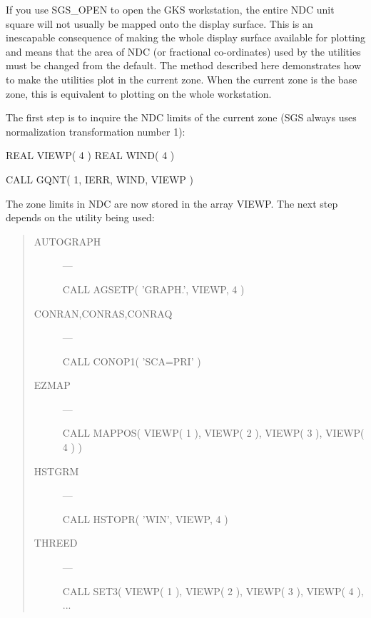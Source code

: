 \documentclass[twoside,11pt,nolof,noabs]{starlink}
\begin{document}
If you use SGS\_OPEN to open the GKS workstation, the entire NDC unit square
will not usually be mapped onto the display surface. 
This is an inescapable consequence of making the whole display surface
available for plotting and means that the area of NDC (or fractional
co-ordinates) used by the utilities must be changed from the default.
The method described here demonstrates how to make the utilities plot in the
current zone. 
When the current zone is the base zone, this is equivalent to plotting on the
whole workstation.

The first step is to inquire the NDC limits of the current zone (SGS always
uses normalization transformation number 1):

\begin{terminalv}
      REAL VIEWP( 4 )
      REAL WIND( 4 )

      CALL GQNT( 1, IERR, WIND, VIEWP )
\end{terminalv}

The zone limits in NDC are now stored in the array VIEWP.  The next
step depends on the utility being used:

\begin{quote}
\begin{description}
\item [AUTOGRAPH] ---
\begin{terminalv}
      CALL AGSETP( 'GRAPH.', VIEWP, 4 )
\end{terminalv}

\item [CONRAN,CONRAS,CONRAQ] ---
\begin{terminalv}
      CALL CONOP1( 'SCA=PRI' )
\end{terminalv}

\item [EZMAP] ---
\begin{terminalv}
      CALL MAPPOS( VIEWP( 1 ), VIEWP( 2 ), VIEWP( 3 ), VIEWP( 4 ) )
\end{terminalv}

\item [HSTGRM] ---
\begin{terminalv}
      CALL HSTOPR( 'WIN', VIEWP, 4 )
\end{terminalv}

\item [THREED] ---
\begin{terminalv}
      CALL SET3( VIEWP( 1 ), VIEWP( 2 ), VIEWP( 3 ), VIEWP( 4 ), ...
\end{terminalv}
\end{description}
\end{quote}
\end{document}
